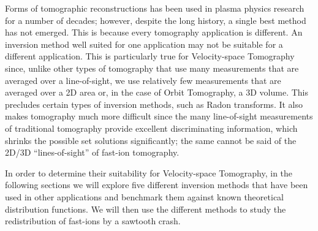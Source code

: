 Forms of tomographic reconstructions has been used in plasma physics research for a number of decades; however,
despite the long history, a single best method has not emerged. This is because every tomography application is different. An inversion method well suited for one application may not be suitable for a different application. This is particularly true for Velocity-space Tomography since, unlike other types of tomography that use many measurements that are averaged over a line-of-sight, we use relatively few measurements that are averaged over a 2D area or, in the case of Orbit Tomography, a 3D volume. This precludes certain types of inversion methods, such as Radon transforms. It also makes tomography much more difficult since the many line-of-sight measurements of traditional tomography provide excellent discriminating information, which shrinks the possible set solutions significantly; the same cannot be said of the 2D/3D ``lines-of-sight'' of fast-ion tomography.

In order to determine their suitability for Velocity-space Tomography, in the following sections we will explore five different inversion methods that have been used in other applications and benchmark them against known theoretical distribution functions. We will then use the different methods to study the redistribution of fast-ions by a sawtooth crash. 

